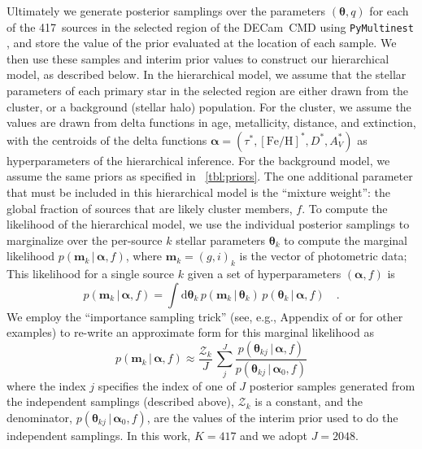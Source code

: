 \documentclass[modern]{aastex62}
\newcommand{\decam}{DECam}
\newcommand{\bs}[1]{\boldsymbol{#1}}
\newcommand{\given}{\,|\,}
\newcommand{\dd}{\mathrm{d}}
\newcommand{\feh}{\ensuremath{[\textrm{Fe} / \textrm{H}]}}
\newcommand{\Nisofit}{417}
\begin{document}
Ultimately we generate posterior samplings over the parameters $(\bs{\theta}, q)$ for each of the \Nisofit\ sources in the selected region of the \decam\ CMD using \texttt{PyMultinest} \citep{TODO}, and store the value of the prior evaluated at the location of each sample.
We then use these samples and interim prior values to construct our hierarchical model, as described below.
In the hierarchical model, we assume that the stellar parameters of each primary star in the selected region are either drawn from the cluster, or a background (stellar halo) population.
For the cluster, we assume the values are drawn from delta functions in age, metallicity, distance, and extinction, with the centroids of the delta functions $\bs{\alpha} = (\tau^*, \feh^*, D^*, A_V^*)$ as hyperparameters of the hierarchical inference.
For the background model, we assume the same priors as specified in \tablename~\ref{tbl:priors}.
The one additional parameter that must be included in this hierarchical model is the ``mixture weight'': the global fraction of sources that are likely cluster members, $f$.
To compute the likelihood of the hierarchical model, we use the individual posterior samplings to marginalize over the per-source $k$ stellar parameters $\bs{\theta}_k$ to compute the marginal likelihood $p(\bs{m}_k \given \bs{\alpha}, f)$, where $\bs{m}_k = (g, i)_k$ is the vector of photometric data;
This likelihood for a single source $k$ given a set of hyperparameters $(\bs{\alpha}, f)$ is
\begin{equation}
    p(\bs{m}_k \given \bs{\alpha}, f) = \int \dd \bs{\theta}_k \,
        p(\bs{m}_k \given \bs{\theta}_k) \,
        p(\bs{\theta}_k \given \bs{\alpha}, f) \quad .
\end{equation}
We employ the ``importance sampling trick'' (see, e.g., Appendix of \citealt{Price-Whelan:2018} or \citealt{Hogg:2008, Foreman-Mackey:2013} for other examples) to re-write an approximate form for this marginal likelihood as
\begin{equation}
    p(\bs{m}_k \given \bs{\alpha}, f) \approx \frac{\mathcal{Z}_k}{J} \,
        \sum_j^J \frac{p(\bs{\theta}_{kj} \given \bs{\alpha}, f)}{p(\bs{\theta}_{kj} \given \bs{\alpha}_0, f)}
        \label{eq:marglike}
\end{equation}
where the index $j$ specifies the index of one of $J$ posterior samples generated from the independent samplings (described above), $\mathcal{Z}_k$ is a constant, and the denominator, $p(\bs{\theta}_{kj} \given \bs{\alpha}_0, f)$, are the values of the interim prior used to do the independent samplings.
In this work, $K=\Nisofit$ and we adopt $J=2048$.
\end{document}
